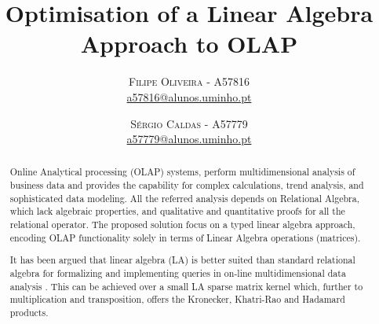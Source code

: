 \documentclass[twoside]{article}
\title{\vspace{-15mm}\fontsize{24pt}{10pt}\selectfont\textbf{Optimisation of a Linear Algebra Approach to OLAP}} %
\author{
\large
\textsc{Filipe Oliveira} - \textsc{A57816}\\
\normalsize \href{mailto:a57816@alunos.uminho.pt}{a57816@alunos.uminho.pt}
\vspace{-5mm}
\and
\textsc{Sérgio Caldas} - \textsc{A57779}\\
\normalsize \href{mailto:a57779@alunos.uminho.pt}{a57779@alunos.uminho.pt}
}
\begin{document}
\maketitle %

\thispagestyle{fancy} %


\begin{abstract}
\indent %
\par Online Analytical processing (OLAP) systems, perform multidimensional analysis of business data and provides the capability for complex calculations, trend analysis, and sophisticated data modeling. 
All the referred analysis depends on Relational Algebra, which lack algebraic properties, and qualitative and quantitative proofs for all the relational operator.
The proposed solution focus on a typed linear algebra approach, encoding OLAP functionality solely in terms of Linear Algebra operations (matrices).
\par It has been argued that linear algebra (LA) is better suited than standard relational algebra for formalizing and implementing queries in on-line multidimensional data analysis \cite{macedo2015linear} \cite{da2015benchmarking}. This can be achieved over a small LA sparse matrix kernel which, further to multiplication and transposition, offers the Kronecker, Khatri-Rao and Hadamard products.

\end{abstract}
\vspace{0.5cm}
\end{document}
